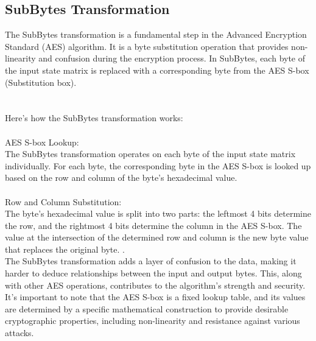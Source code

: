 \documentclass{report}
\begin{document}
\subsection{SubBytes Transformation}
The SubBytes transformation is a fundamental step in the Advanced Encryption Standard (AES) algorithm. It is a byte substitution operation that provides non-linearity and confusion during the encryption process. In SubBytes, each byte of the input state matrix is replaced with a corresponding byte from the AES S-box (Substitution box).\\
\\
\\
Here's how the SubBytes transformation works:\\
\\
AES S-box Lookup:\\
The SubBytes transformation operates on each byte of the input state matrix individually. For each byte, the corresponding byte in the AES S-box is looked up based on the row and column of the byte's hexadecimal value.\\
\\
Row and Column Substitution:\\
The byte's hexadecimal value is split into two parts: the leftmost 4 bits determine the row, and the rightmost 4 bits determine the column in the AES S-box. The value at the intersection of the determined row and column is the new byte value that replaces the original byte.
.\\
The SubBytes transformation adds a layer of confusion to the data, making it harder to deduce relationships between the input and output bytes. This, along with other AES operations, contributes to the algorithm's strength and security.\\
It's important to note that the AES S-box is a fixed lookup table, and its values are determined by a specific mathematical construction to provide desirable cryptographic properties, including non-linearity and resistance against various attacks.
\end{document}
